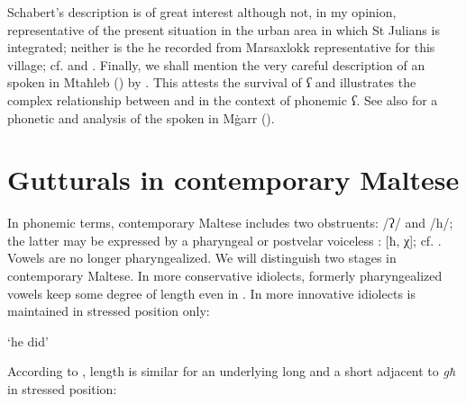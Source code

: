 \documentclass[output=paper]{langsci/langscibook}
\begin{document}
Schabert's description is of great interest although not, in my opinion, representative of the present  situation in the urban area in which St Julians is integrated; neither is the  he recorded from Marsaxlokk representative for this village;
cf. \citet[text 43 and 44-50]{Puech1994} and \citet[235-253]{AzzopardiAlexander2011}. Finally, we shall mention the very careful description of an  spoken in Mtaħleb () by \citet{Vanhove1991}. This  attests the survival of \textit{ʕ} and illustrates the complex relationship between  and  in the context of phonemic \textit{ʕ}. See also \citet{Vanhove1994} for a phonetic and  analysis of the  spoken in M\.garr ().

\section{Gutturals in contemporary Maltese}

In phonemic terms, contemporary Maltese includes two  obstruents: /ʔ/ and /h/; the latter may be expressed by a pharyngeal or postvelar voiceless : [ħ, χ]; cf. \citet[259]{Borg1997}. Vowels are no longer pharyngealized. We will distinguish two stages in contemporary Maltese. In more conservative idiolects, formerly pharyngealized vowels keep some degree of length even in . In more innovative idiolects  is maintained in stressed position only:

\ea%
 { `he did'}
\z

\ea%
\z

According to \citet[36-38]{Hume2009}, length is similar for an underlying long  and a short  adjacent to \textit{għ} in stressed position:

\puechlengths{1.5cm}{2.5cm}{4.5cm}{3cm}{1cm}{1cm}
\ea%
    \label{ex:puech:26}
\z
\end{document}
